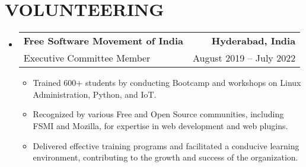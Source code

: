 \documentclass[letterpaper,10pt]{article}
\makeatletter
\newcommand{\resumeItem}[1]{
  \item\small{
    {#1 \vspace{-2pt}}
  }
}
\newcommand{\resumeSubheading}[4]{
  \vspace{-2pt}\item
    \begin{tabular*}{1.0\textwidth}[t]{l@{\extracolsep{\fill}}r}
      \textbf{#1} & \textbf{\small #2} \\
      {\small#3} & {\small #4} \\
    \end{tabular*}\vspace{-7pt}
}
\newcommand{\resumeSubHeadingListStart}{\begin{itemize}[leftmargin=0.0in, label={}]}
\newcommand{\resumeSubHeadingListEnd}{\end{itemize}}
\newcommand{\resumeItemListStart}{\begin{itemize}}
\newcommand{\resumeItemListEnd}{\end{itemize}\vspace{-5pt}}
\makeatother
\begin{document}
\section{VOLUNTEERING}
    \resumeSubHeadingListStart
        \resumeSubheading{Free Software Movement of India}{Hyderabad, India}{Executive Committee Member}{August 2019 -- July 2022}
            \resumeItemListStart
                \resumeItem{Trained 600+ students by conducting Bootcamp and workshops on Linux Administration, Python, and IoT.}
                \resumeItem{Recognized by various Free and Open Source communities, including FSMI and Mozilla, for expertise in web development and web plugins.}
                \resumeItem{Delivered effective training programs and facilitated a conducive learning environment, contributing to the growth and success of the organization.}
            \resumeItemListEnd
        
    \resumeSubHeadingListEnd
\end{document}
